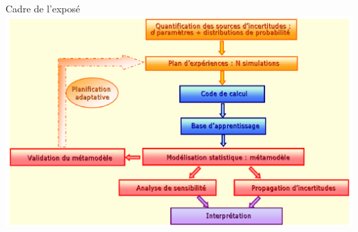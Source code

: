 \begin{frame}{Cadre de l'exposé}
 \includegraphics[width=\textwidth]{fig/schemaSeb.png}
\end{frame}

